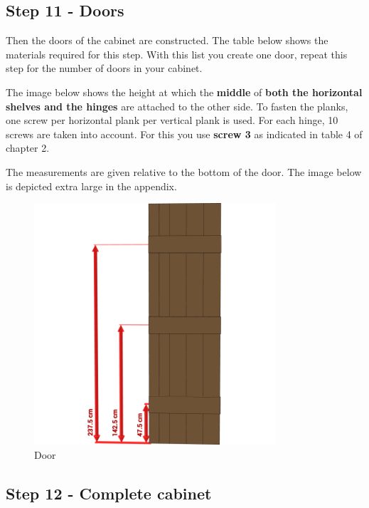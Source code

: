 \documentclass{article}
\begin{document}
\subsection{Step 11 - Doors}

Then the doors of the cabinet are constructed. The table below shows the materials required for this step. With this list you create one door, repeat this step for the number of doors in your cabinet.



The image below shows the height at which the \textbf{middle} of \textbf{both the horizontal shelves and the hinges} are attached to the other side. To fasten the planks, one screw per horizontal plank per vertical plank is used. For each hinge, 10 screws are taken into account. For this you use \textbf{screw 3} as indicated in table 4 of chapter 2.

The measurements are given relative to the bottom of the door. The image below is depicted extra large in the appendix.

\begin{figure}[h!]
    \centering
    \includegraphics[width=0.8\textwidth]{scene 11 - deur.png}
    \caption{Door}
    \label{fig:stap 11}
\end{figure}

\clearpage
\newpage

\subsection{Step 12 - Complete cabinet}
\end{document}
